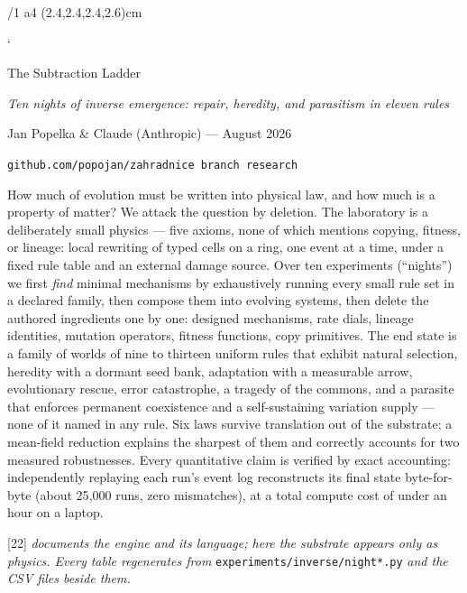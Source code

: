\fontfam[Equity]
\hyperlinks \Blue \Blue
\report
\margins/1 a4 (2.4,2.4,2.4,2.6)cm
\typosize[11/13.8]

\def\repo#1{{\tt #1}}
\def\lawname#1{{\bf #1.}}
\def\g#1{{\tt #1}}
\verbchar`

\tit The Subtraction Ladder

\centerline{\it Ten nights of inverse emergence: repair, heredity,
and parasitism in eleven rules}
\medskip
\centerline{Jan Popelka \& Claude (Anthropic) --- August 2026}
\centerline{\tt github.com/popojan/zahradnice \quad branch {\tt research}
\quad \repo{experiments/inverse/}}
\bigskip

How much of evolution must be written into physical law, and how
much is a property of matter? We attack the question by deletion.
The laboratory is a deliberately small physics --- five axioms, none
of which mentions copying, fitness, or lineage: local rewriting of
typed cells on a ring, one event at a time, under a fixed rule
table and an external damage source. Over ten experiments
(“nights”) we first {\it find} minimal mechanisms by exhaustively
running every small rule set in a declared family, then compose
them into evolving systems, then delete the authored ingredients
one by one: designed mechanisms, rate dials, lineage identities,
mutation operators, fitness functions, copy primitives. The end
state is a family of worlds of nine to thirteen uniform rules that
exhibit natural selection, heredity with a dormant seed bank,
adaptation with a measurable arrow, evolutionary rescue, error
catastrophe, a tragedy of the commons, and a parasite that enforces
permanent coexistence and a self-sustaining variation supply ---
none of it named in any rule. Six laws survive translation out of
the substrate; a mean-field reduction explains the sharpest of them
and correctly accounts for two measured robustnesses. Every
quantitative claim is verified by exact accounting: independently
replaying each run's event log reconstructs its final state
byte-for-byte (about 25{,}000 runs, zero mismatches), at a total
compute cost of under an hour on a laptop.

\medskip
{} [22] {\it documents the engine and its language; here
the substrate appears only as physics. Every table regenerates
from} \repo{experiments/inverse/night*.py} {\it and the CSV files
beside them.}

